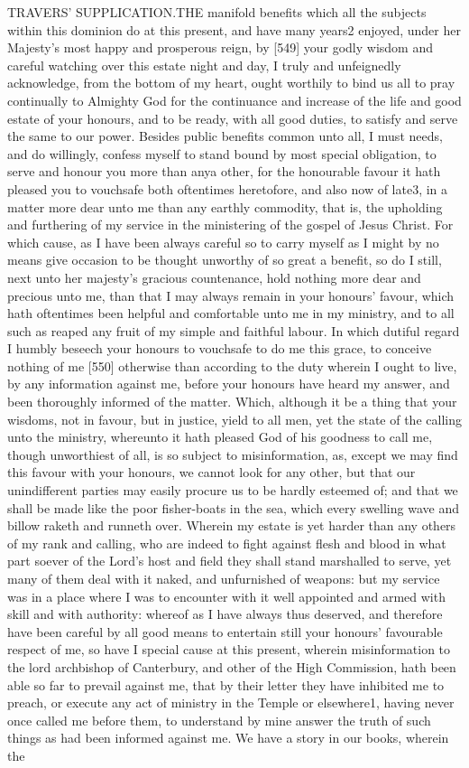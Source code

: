 TRAVERS’ SUPPLICATION.THE manifold benefits which all the subjects within this dominion do at this present, and have many years2 enjoyed, under her Majesty’s most happy and prosperous reign, by [549] your godly wisdom and careful watching over this estate night and day, I truly and unfeignedly acknowledge, from the bottom of my heart, ought worthily to bind us all to pray continually to Almighty God for the continuance and increase of the life and good estate of your honours, and to be ready, with all good duties, to satisfy and serve the same to our power. Besides public benefits common unto all, I must needs, and do willingly, confess myself to stand bound by most special obligation, to serve and honour you more than anya other, for the honourable favour it hath pleased you to vouchsafe both oftentimes heretofore, and also now of late3, in a matter more dear unto me than any earthly commodity, that is, the upholding and furthering of my service in the ministering of the gospel of Jesus Christ. For which cause, as I have been always careful so to carry myself as I might by no means give occasion to be thought unworthy of so great a benefit, so do I still, next unto her majesty’s gracious countenance, hold nothing more dear and precious unto me, than that I may always remain in your honours’ favour, which hath oftentimes been helpful and comfortable unto me in my ministry, and to all such as reaped any fruit of my simple and faithful labour. In which dutiful regard I humbly beseech your honours to vouchsafe to do me this grace, to conceive nothing of me [550] otherwise than according to the duty wherein I ought to live, by any information against me, before your honours have heard my answer, and been thoroughly informed of the matter. Which, although it be a thing that your wisdoms, not in favour, but in justice, yield to all men, yet the state of the calling unto the ministry, whereunto it hath pleased God of his goodness to call me, though unworthiest of all, is so subject to misinformation, as, except we may find this favour with your honours, we cannot look for any other, but that our unindifferent parties may easily procure us to be hardly esteemed of; and that we shall be made like the poor fisher-boats in the sea, which every swelling wave and billow raketh and runneth over. Wherein my estate is yet harder than any others of my rank and calling, who are indeed to fight against flesh and blood in what part soever of the Lord’s host and field they shall stand marshalled to serve, yet many of them deal with it naked, and unfurnished of weapons: but my service was in a place where I was to encounter with it well appointed and armed with skill and with authority: whereof as I have always thus deserved, and therefore have been careful by all good means to entertain still your honours’ favourable respect of me, so have I special cause at this present, wherein misinformation to the lord archbishop of Canterbury, and other of the High Commission, hath been able so far to prevail against me, that by their letter they have inhibited me to preach, or execute any act of ministry in the Temple or elsewhere1, having never once called me before them, to understand by mine answer the truth of such things as had been informed against me. We have a story in our books, wherein the 